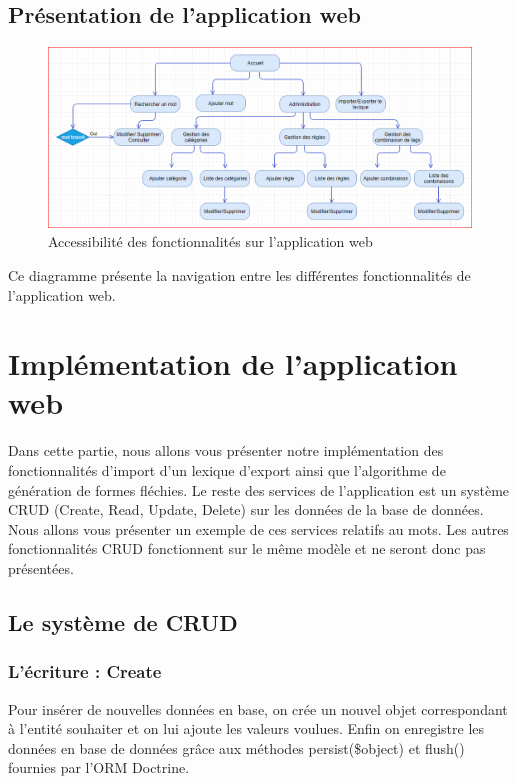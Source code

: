 \documentclass[12pt,a4paper]{article}
\begin{document}
\subsection{Présentation de l'application web}

\begin{figure}[h]
\centering
\includegraphics[width=150mm]{img/site.PNG}
\caption{Accessibilité des fonctionnalités sur l'application web}
\label{Tux}
\end{figure}

Ce diagramme présente la navigation entre les différentes fonctionnalités de l'application web.

\newpage

\section{Implémentation de l'application web}

Dans cette partie, nous allons vous présenter notre implémentation des fonctionnalités d'import d'un lexique d'export ainsi que l'algorithme de génération de formes fléchies.
Le reste des services de l'application est un système CRUD (Create, Read, Update, Delete) sur les données de la base de données.
Nous allons vous présenter un exemple de ces services relatifs au mots. Les autres fonctionnalités CRUD fonctionnent sur le même modèle et ne seront donc pas présentées.

\subsection{Le système de CRUD}

\subsubsection{L'écriture : Create}

Pour insérer de nouvelles données en base, on crée un nouvel objet correspondant à l'entité souhaiter et on lui ajoute les valeurs voulues.
Enfin on enregistre les données en base de données grâce aux méthodes persist(\$object) et flush() fournies par l'ORM Doctrine.
\end{document}
